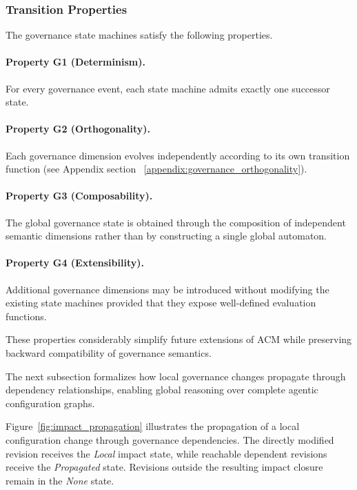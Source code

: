 \documentclass[10pt]{article}
\begin{document}
	\subsubsection{Transition Properties}
	
	The governance state machines satisfy the following properties.
	
	\paragraph{Property G1 (Determinism).}
	
	For every governance event, each state machine admits exactly one successor
	state.
	
	\paragraph{Property G2 (Orthogonality).}
	
	Each governance dimension evolves independently according to its own transition
	function (see Appendix section ~\ref{appendix:governance_orthogonality}).
	
	\paragraph{Property G3 (Composability).}
	
	The global governance state is obtained through the composition of independent
	semantic dimensions rather than by constructing a single global automaton.
	
	\paragraph{Property G4 (Extensibility).}
	
	Additional governance dimensions may be introduced without modifying the
	existing state machines provided that they expose well-defined evaluation
	functions.
	
	These properties considerably simplify future extensions of ACM while
	preserving backward compatibility of governance semantics.
	
	The next subsection formalizes how local governance changes propagate through
	dependency relationships, enabling global reasoning over complete agentic
	configuration graphs.
	
	Figure~\ref{fig:impact_propagation} illustrates the propagation of a local
	configuration change through governance dependencies. The directly modified
	revision receives the \textit{Local} impact state, while reachable dependent
	revisions receive the \textit{Propagated} state. Revisions outside the
	resulting impact closure remain in the \textit{None} state.
	
\end{document}
